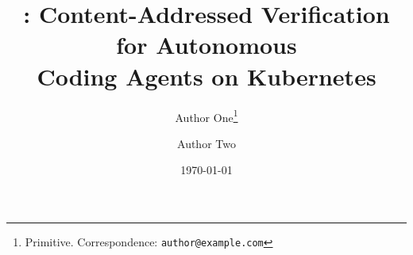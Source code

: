 \documentclass[11pt]{article}
\title{\sysname: Content-Addressed Verification for Autonomous\\
       Coding Agents on Kubernetes}
\author{
  Author One\thanks{Primitive. Correspondence: \texttt{author@example.com}} \\
  \and
  Author Two \\
}
\date{\today}
\theoremstyle{definition}
\theoremstyle{plain}
\begin{document}
\maketitle

\begin{abstract}
  
\end{abstract}




















\appendix


\end{document}

